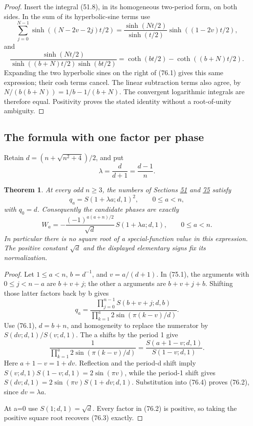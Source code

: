 \documentclass[11pt,reqno]{amsart}
\theoremstyle{plain}
\newtheorem{theorem}{Theorem}[section]
\begin{document}
\begin{proof}
Insert the integral (51.8), in its homogeneous two-period
form, on both sides. In the sum of its hyperbolic-sine terms use
\[
 \sum_{j=0}^{N-1}\sinh((N-2v-2j)t/2)
 =\frac{\sinh(Nt/2)}{\sinh(t/2)}\sinh((1-2v)t/2),
\]
and
\[
 \frac{\sinh(Nt/2)}{\sinh((b+N)t/2)\sinh(bt/2)}
 =\coth(bt/2)-\coth((b+N)t/2).
\]
Expanding the two hyperbolic sines on the right of (76.1) gives this
same expression; their cosh terms cancel. The linear subtraction terms
also agree, by \(N/(b(b+N))=1/b-1/(b+N)\). The convergent logarithmic
integrals are therefore equal. Positivity proves the stated identity
without a root-of-unity ambiguity.
\end{proof}

\subsection{The formula with one factor per phase}\label{sec:76.2}

Retain \(d=(n+\sqrt{n^2+4})/2\), and put
\[
 \lambda=\frac{d}{d+1}=\frac{d-1}{n}.
\]

\begin{theorem}
At every odd \(n\ge3\), the numbers of Sections \hyperref[sec:51]{51} and \hyperref[sec:75]{75}
satisfy
\begin{equation*}
 \boxed{\displaystyle
 q_a=S(1+\lambda a;d,1)^2,\qquad 0\le a<n,}
 \tag{76.2}
\end{equation*}
with \(q_0=d\). Consequently the candidate phases are exactly
\begin{equation*}
 \boxed{\displaystyle
 W_a=-\frac{(-1)^{a(a+n)/2}}{\sqrt d}\,
 S(1+\lambda a;d,1),\qquad 0\le a<n.}
 \tag{76.3}
\end{equation*}
In particular there is no square root of a special-function value in
this expression. The positive constant \(\sqrt d\) and the displayed
elementary signs fix its normalization.
\end{theorem}

\begin{proof}
Let \(1\le a<n\), \(b=d^{-1}\), and \(v=a/(d+1)\).
In (75.1), the arguments with \(0\le j<n-a\) are \(b+v+j\);
the other a arguments are \(b+v+j+b\). Shifting those latter factors
back by b gives
\begin{equation*}
 q_a=
 \frac{\prod_{j=0}^{n-1}S(b+v+j;d,b)}
      {\prod_{k=1}^{a}2\sin(\pi(k-v)/d)}.
 \tag{76.4}
\end{equation*}
Use (76.1), \(d=b+n\), and homogeneity to replace the numerator by
\(S(dv;d,1)/S(v;d,1)\). The a shifts by the period 1 give
\[
 \frac{1}{\prod_{k=1}^{a}2\sin(\pi(k-v)/d)}
 =\frac{S(a+1-v;d,1)}{S(1-v;d,1)}.
\]
Here \(a+1-v=1+dv\). Reflection and the period-d shift imply
\(S(v;d,1)S(1-v;d,1)=2\sin(\pi v)\), while the period-1 shift gives
\(S(dv;d,1)=2\sin(\pi v)S(1+dv;d,1)\). Substitution into (76.4)
proves (76.2), since \(dv=\lambda a\).

At a=0 use \(S(1;d,1)=\sqrt d\). Every factor in (76.2) is positive,
so taking the positive square root recovers (76.3) exactly.
\end{proof}
\end{document}
